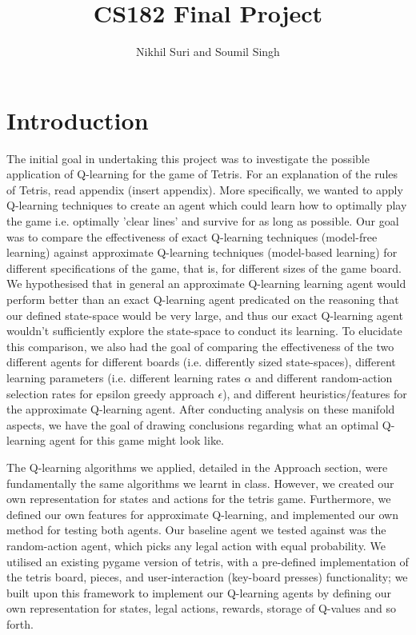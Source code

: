 \documentclass[11pt]{article}
\title{CS182 Final Project}
\author{Nikhil Suri and Soumil Singh}
\begin{document}
\maketitle{}


\section{Introduction}
The initial goal in undertaking this project was to investigate the possible application of Q-learning for the game of Tetris. For an explanation of the rules of Tetris, read appendix (insert appendix). More specifically, we wanted to apply Q-learning techniques to create an agent which could learn how to optimally play the game i.e. optimally 'clear lines' and survive for as long as possible. Our goal was to compare the effectiveness of exact Q-learning techniques (model-free learning) against approximate Q-learning techniques (model-based learning) for different specifications of the game, that is, for different sizes of the game board. We hypothesised that in general an approximate Q-learning learning agent would perform better than an exact Q-learning agent predicated on the reasoning that our defined state-space would be very large, and thus our exact Q-learning agent wouldn't sufficiently explore the state-space to conduct its learning. To elucidate this comparison, we also had the goal of comparing the effectiveness of the two different agents for different boards (i.e. differently sized state-spaces), different learning parameters (i.e. different learning rates $\alpha$ and different random-action selection rates for epsilon greedy approach $\epsilon$), and different heuristics/features for the approximate Q-learning agent. After conducting analysis on these manifold aspects, we have the goal of drawing conclusions regarding what an optimal Q-learning agent for this game might look like.

The Q-learning algorithms we applied, detailed in the Approach section, were fundamentally the same algorithms we learnt in class. However, we created our own representation for states and actions for the tetris game. Furthermore, we defined our own features for approximate Q-learning, and implemented our own method for testing both agents. Our baseline agent we tested against was the random-action agent, which picks any legal action with equal probability. We utilised an existing pygame version of tetris, with a pre-defined implementation of the tetris board, pieces, and user-interaction (key-board presses) functionality; we built upon this framework to implement our Q-learning agents by defining our own representation for states, legal actions, rewards, storage of Q-values and so forth.
\end{document}
